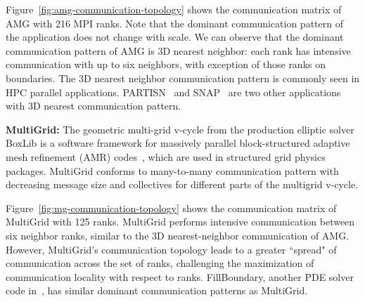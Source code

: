 Figure~\ref{fig:amg-communication-topology} shows the communication matrix of AMG with 216 MPI ranks. Note that the dominant communication pattern of the application does not change with scale. We can observe that the dominant communication pattern of AMG is 3D nearest neighbor: each rank has intensive communication with up to six neighbors, with exception of those ranks on boundaries. The 3D nearest neighbor communication pattern is commonly seen in HPC parallel applications. PARTISN~\cite{partisn} and SNAP~\cite{snap} are two other applications with 3D nearest communication pattern. 




\textbf{MultiGrid:} The geometric multi-grid v-cycle from the production elliptic solver BoxLib is a software framework for massively parallel block-structured adaptive mesh refinement (AMR) codes~\cite{boxlib}, which are used in structured grid physics packages. MultiGrid conforms to many-to-many communication pattern with decreasing message size and collectives for different parts of the multigrid v-cycle. 

Figure~\ref{fig:mg-communication-topology} shows the communication matrix of MultiGrid with 125 ranks. MultiGrid performs intensive communication between six neighbor ranks, similar to the 3D nearest-neighbor communication of AMG. However, MultiGrid's communication topology leads to a greater ``spread" of communication across the set of ranks, challenging the maximization of communication locality with respect to ranks. FillBoundary, another PDE solver code in~\cite{boxlib}, has similar dominant communication patterns as MultiGrid.  




